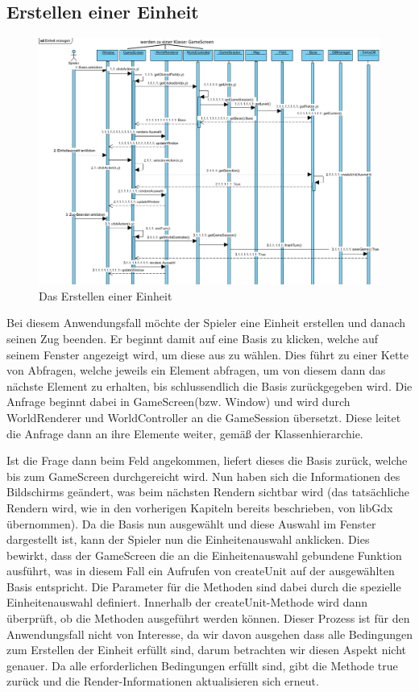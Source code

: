 \documentclass[fontsize=12pt,paper=a4,twoside]{scrartcl}
\begin{document}
\subsection{Erstellen einer Einheit}
\begin{figure}[h]
\centering
\includegraphics[width=1.0\linewidth]{sequenzdiagramm1}
\caption{Das Erstellen einer Einheit}
\label{fig:sequenzdiagramm1}
\end{figure}

Bei diesem Anwendungsfall möchte der Spieler eine Einheit erstellen und danach seinen Zug beenden.
Er beginnt damit auf eine Basis zu klicken, welche auf seinem Fenster angezeigt wird, um diese aus zu wählen. Dies führt zu einer Kette von Abfragen, welche jeweils ein Element abfragen, um von diesem dann das nächste Element zu erhalten, bis schlussendlich die Basis zurückgegeben wird. Die Anfrage beginnt dabei in GameScreen(bzw. Window) und wird durch WorldRenderer und WorldController an die GameSession übersetzt. Diese leitet die Anfrage dann an ihre Elemente weiter, gemäß der Klassenhierarchie. 

Ist die Frage dann beim Feld angekommen, liefert dieses die Basis zurück, welche bis zum GameScreen durchgereicht wird. Nun haben sich die Informationen des Bildschirms geändert, was beim nächsten Rendern sichtbar wird (das tatsächliche Rendern wird, wie in den vorherigen Kapiteln bereits beschrieben, von libGdx übernommen). Da die Basis nun ausgewählt und diese Auswahl im Fenster dargestellt ist, kann der Spieler nun die Einheitenauswahl anklicken. Dies bewirkt, dass der GameScreen die an die Einheitenauswahl gebundene Funktion ausführt, was in diesem Fall ein Aufrufen von createUnit auf der ausgewählten Basis entspricht. Die Parameter für die Methoden sind dabei durch die spezielle Einheitenauswahl definiert. Innerhalb der createUnit-Methode wird dann überprüft, ob die Methoden ausgeführt werden können. Dieser Prozess ist für den Anwendungsfall nicht von Interesse, da wir davon ausgehen dass alle Bedingungen zum Erstellen der Einheit erfüllt sind, darum betrachten wir diesen Aspekt nicht genauer. Da alle erforderlichen Bedingungen erfüllt sind, gibt die Methode true zurück und die Render-Informationen aktualisieren sich erneut.
\end{document}
